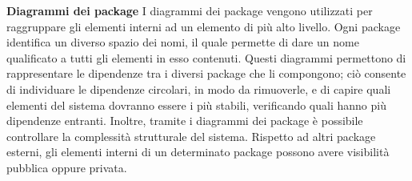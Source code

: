 						\textbf{Diagrammi dei package}
						\newline
						\newline
						\hangindent=0.6cm I diagrammi dei package vengono utilizzati per raggruppare gli elementi interni ad un elemento di più alto livello. Ogni package identifica un diverso spazio dei nomi, il quale permette di dare un nome qualificato a tutti gli elementi in esso contenuti.
						\newline
						\hangindent=0.6cm Questi diagrammi permettono di rappresentare le dipendenze tra i diversi package che li compongono; ciò consente di individuare le dipendenze circolari, in modo da rimuoverle, e di capire quali elementi del sistema dovranno essere i più stabili, verificando quali hanno più dipendenze entranti. Inoltre, tramite i diagrammi dei package è possibile controllare la complessità strutturale del sistema.
						\newline
						\hangindent=0.6cm Rispetto ad altri package esterni, gli elementi interni di un determinato package possono avere visibilità pubblica oppure privata.
						
